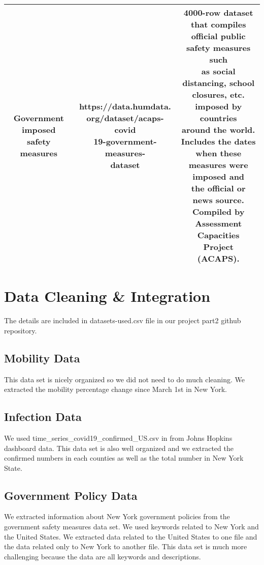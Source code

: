 \documentclass[a4paper,12pt]{article}
\begin{document}
\begin{spacing}{1.3}
\begin{table}
\begin{tabular}{|c|c|c|}
\tabincell{c}{Government imposed \\safety measures} & \tabincell{c}{https://data.humdata.\\org/dataset/acaps-covid\\19-government-measures-\\dataset} & \tabincell{c}{4000-row dataset that compiles \\official public safety measures such \\as social distancing, school \\closures, etc. imposed by countries \\around the world. \\Includes the dates when these \\measures were imposed and \\the official or news source. \\Compiled by Assessment \\Capacities Project (ACAPS).}\\
\hline 
\end{tabular}

\end{table}


\section{Data Cleaning \& Integration}
The details are included in datasets-used.csv file in our project part2 github repository.


\subsection{Mobility Data}
This data set is nicely organized so we did not need to do much cleaning. We extracted the mobility percentage change since March 1st in New York.

\subsection{Infection Data}
We used time\_series\_covid19\_confirmed\_US.csv in from Johns Hopkins dashboard data. This data set is also well organized and we extracted the confirmed numbers in each counties as well as the total number in New York State.

\subsection{Government Policy Data}
We extracted information about New York government policies from the government safety measures data set. We used keywords related to New York and the United States. We extracted data related to the United States to one file and the data related only to New York to another file. This data set is much more challenging because the data are all keywords and descriptions.


\end{spacing}
\end{document}
